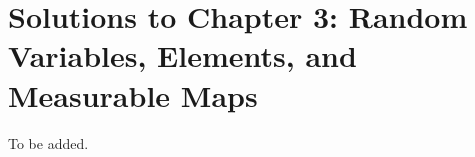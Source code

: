 \section{Solutions to Chapter 3: Random Variables, Elements, and Measurable Maps}
\label{sec:solutions-chapter-3}

\setcounter{Lcount}{0}
\begin{list}{3.4.}{}
\item To be added.
\end{list}

\clearpage{}


